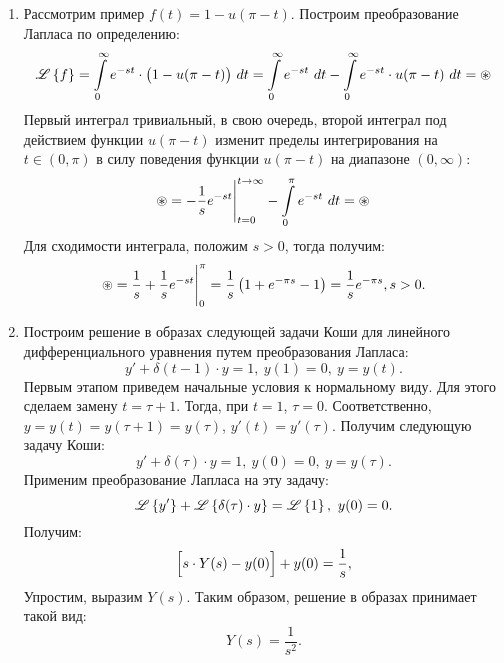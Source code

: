 		\begin{enumerate}
			\item Рассмотрим пример $f(t) = 1 - u(\pi-t)$. Построим преобразование Лапласа по определению:
				\[ 
					\mathscr{L} \left\lbrace {f} \right\rbrace 
						= \int\limits_{0}^{\infty} e^{-st} \cdot \bigl( 1 - u(\pi-t) \bigr) ~ dt 
						= \int\limits_{0}^{\infty} e^{-st} ~ dt - \int\limits_{0}^{\infty} e^{-st} \cdot u(\pi-t) ~ dt 
						= \circledast 
				\]
				Первый интеграл тривиальный, в свою очередь, второй интеграл под действием функции $u(\pi-t)$ изменит пределы интегрирования на $t \in (0, \pi)$ в силу поведения функции $u(\pi-t)$ на диапазоне $(0, \infty)$:
				\[ \circledast 
						= -\frac{1}{s} e^{-st} \Biggl\vert \Biggr._{t = 0}^{t \to \infty} - \int\limits_{0}^{\pi} e^{-st} ~ dt 
						= \circledast 
				\]
				Для сходимости интеграла, положим $s > 0$, тогда получим:
				\[ \circledast 
						= \frac{1}{s} + \frac{1}{s} e^{-st} \Biggl\vert \Biggr._{0}^{\pi} 
						= \frac{1}{s} \left( 1 + e^{-\pi s} - 1 \right) 
						= \frac{1}{s} e^{-\pi s}, s > 0. 
				\]

			\item Построим решение в образах следующей задачи Коши для линейного дифференциального уравнения путем преобразования Лапласа:
				\[ y' + \delta(t-1) \cdot y = 1, ~ y(1) = 0, ~ y = y(t). \]
				Первым этапом приведем начальные условия к нормальному виду. Для этого сделаем замену $t = \tau + 1$. Тогда, при $t = 1$, $\tau = 0$. Соответственно, $y = y(t) = y(\tau+1) = y(\tau)$, $y'(t) = y'(\tau)$. Получим следующую задачу Коши:
				\[ y' + \delta(\tau) \cdot y = 1, ~ y(0) = 0, ~ y = y(\tau). \]
				Применим преобразование Лапласа на эту задачу:
				\[ \mathscr{L} \left\lbrace {y'} \right\rbrace + \mathscr{L} \left\lbrace {\delta(\tau) \cdot y} \right\rbrace = \mathscr{L} \left\lbrace {1} \right\rbrace, ~ y(0) = 0. \]
				Получим:
				\[ \Bigl[ s \cdot Y(s) - y(0) \Bigr] + y(0) = \frac{1}{s}, \]
				Упростим, выразим $Y(s)$. Таким образом, решение в образах принимает такой вид:
				\[ Y(s) = \frac{1}{s^2}. \]

		\end{enumerate}
	
